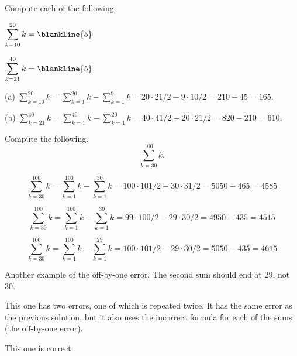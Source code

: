 \begin{exer}
Compute each of the following.
\begin{lenum}
\item ${\displaystyle \sum_{k=10}^{20} k = \blankline{5} }$
\item ${\displaystyle \sum_{k=21}^{40} k = \blankline{5} }$
\end{lenum}
\begin{answer}
(a) ${\displaystyle \sum_{k=10}^{20} k 
=\sum_{k=1}^{20} k - \sum_{k=1}^{9} k
=20\cdot 21/2 - 9\cdot 10/2 = 210 - 45 = 165}$.

(b) ${\displaystyle \sum_{k=21}^{40} k 
=\sum_{k=1}^{40} k - \sum_{k=1}^{20} k
=40\cdot 41/2 - 20\cdot 21/2 = 820-210 = 610}.$
\end{answer}
\end{exer}
\begin{eval}
Compute the following.
$$\sum_{k=30}^{100} k.$$
\begin{ssolenum}
\item
$${\displaystyle \sum_{k=30}^{100} k=
\sum_{k=1}^{100} k - \sum_{k=1}^{30} k=
100\cdot 101/2 - 30\cdot 31/2 = 5050 - 465 =4585
}$$

\noindent
\evallinetwo
\item
$${\displaystyle \sum_{k=30}^{100} k=
\sum_{k=1}^{100} k - \sum_{k=1}^{30} k=
99\cdot 100/2 - 29\cdot 30/2 = 4950 - 435 = 4515
}$$

\noindent
\evallinetwo
\item
$${\displaystyle \sum_{k=30}^{100} k=
\sum_{k=1}^{100} k - \sum_{k=1}^{29} k=
100\cdot 101/2 - 29\cdot 30/2 = 5050 - 435 =4615
}$$

\noindent
\evallinetwo
\end{ssolenum}
\begin{answer}
\begin{solevalenum}
\item
Another example of the off-by-one error.
The second sum should end at $29$, not $30$.
\item
This one has two errors, one of which is repeated twice.
It has the same error as the previous solution, but it also uses
the incorrect formula for each of the sums (the off-by-one error).
\item
This one is correct.
\end{solevalenum}
\end{answer}
\end{eval}

